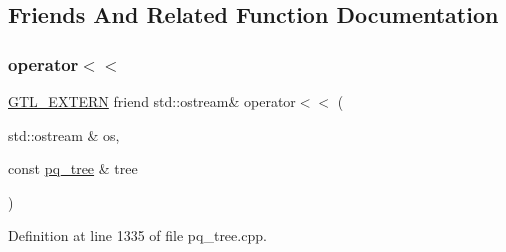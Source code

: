 \subsection{Friends And Related Function Documentation}
\mbox{\label{classpq__tree_a2db830bf75339bd39c819c231c03769b}} 
\subsubsection{\texorpdfstring{operator$<$$<$}{operator<<}}
{\footnotesize\ttfamily \mbox{\hyperlink{_g_t_l_8h_a014cd1e9b3e67a78ae433eda95c8fd25}{G\+T\+L\+\_\+\+E\+X\+T\+E\+RN}} friend std\+::ostream\& operator$<$$<$ (\begin{DoxyParamCaption}\item[{std\+::ostream \&}]{os,  }\item[{const \mbox{\hyperlink{classpq__tree}{pq\+\_\+tree}} \&}]{tree }\end{DoxyParamCaption})\hspace{0.3cm}{\ttfamily [friend]}}



Definition at line 1335 of file pq\+\_\+tree.\+cpp.



